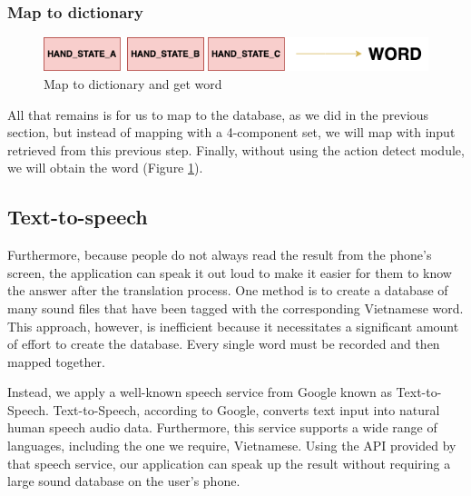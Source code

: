 
      
      
    \subsubsection{ Map to dictionary }

      \begin{figure}[H]
        \centering
        \includegraphics[width=\textwidth]{img/Chap4/Result.png}
        \caption{ Map to dictionary and get word }
        \label{fig:Chap4-Result}
      \end{figure}


All that remains is for us to map to the database, as we did in the previous section, but instead of mapping with a 4-component set, we will map with input retrieved from this previous step. Finally, without using the action detect module, we will obtain the word (Figure \ref{fig:Chap4-Result}).

\subsection{Text-to-speech}

Furthermore, because people do not always read the result from the phone's screen, the application can speak it out loud to make it easier for them to know the answer after the translation process. One method is to create a database of many sound files that have been tagged with the corresponding Vietnamese word. This approach, however, is inefficient because it necessitates a significant amount of effort to create the database. Every single word must be recorded and then mapped together.

Instead, we apply a well-known speech service from Google known as Text-to-Speech\cite{GG:Text-to-Speech}. Text-to-Speech, according to Google, converts text input into natural human speech audio data. Furthermore, this service supports a wide range of languages, including the one we require, Vietnamese. Using the API provided by that speech service, our application can speak up the result without requiring a large sound database on the user's phone.

